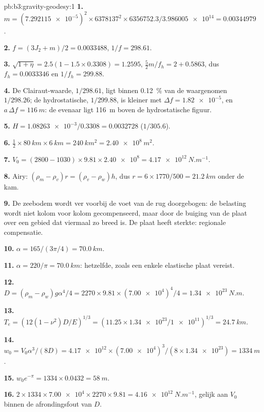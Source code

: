 \begin{solution}{pb:b3:gravity-geodesy:1}
\textbf{1.} $m = (\num{7.292115e-5})^2\times6378137^2\times6356752.3/
\num{3.986005e14} = \num{0.00344979}$.

\textbf{2.} $f = (3J_2 + m)/2 = \num{0.0033488}$, $1/f = 298.61$.

\textbf{3.} $\sqrt{1 + \eta} = 2.5(1 - 1.5\times0.3308) = 1.2595$,
$\tfrac52m/f_h = 2 + 0.5863$, dus $f_h = \num{0.0033346}$ en $1/f_h = 299.88$.

\textbf{4.} De Clairaut-waarde, $1/298.61$, ligt binnen \qty{0.12}{\percent} van
de waargenomen $1/298.26$; de hydrostatische, $1/299.88$, is kleiner met
$\Delta f = \num{1.82e-5}$, en $a\,\Delta f = \qty{116}{m}$: de evenaar ligt
\qty{116}{m} boven de hydrostatische figuur.

\textbf{5.} $H = \num{1.08263e-3}/0.3308 = \num{0.0032728}$ ($1/305.6$).

\textbf{6.} $\tfrac12\times\qty{80}{km}\times\qty{6}{km} = \qty{240}{km^2} =
\qty{2.40e8}{m^2}$.

\textbf{7.} $V_0 = (2800 - 1030)\times9.81\times\num{2.40e8} =
\qty{4.17e12}{N.m^{-1}}$.

\textbf{8.} Airy: $(\rho_m - \rho_v)r = (\rho_v - \rho_w)h$, dus $r =
6\times1770/500 = \qty{21.2}{km}$ onder de kam.

\textbf{9.} De zeebodem wordt ver voorbij de voet van de rug doorgebogen: de
belasting wordt niet kolom voor kolom gecompenseerd, maar door de buiging van de plaat over een
gebied dat viermaal zo breed is. De plaat heeft sterkte: regionale compensatie.

\textbf{10.} $\alpha = 165/(3\pi/4) = \qty{70.0}{km}$.

\textbf{11.} $\alpha = 220/\pi = \qty{70.0}{km}$: hetzelfde, zoals een enkele elastische
plaat vereist.

\textbf{12.} $D = (\rho_m - \rho_w)g\alpha^4/4 = 2270\times9.81\times(\num{7.00e4})^4/4
= \qty{1.34e23}{N.m}$.

\textbf{13.} $T_e = (12(1 - \nu^2)D/E)^{1/3} = (11.25\times\num{1.34e23}/
\num{1e11})^{1/3} = \qty{24.7}{km}$.

\textbf{14.} $w_0 = V_0\alpha^3/(8D) = \num{4.17e12}\times(\num{7.00e4})^3/
(8\times\num{1.34e23}) = \qty{1334}{m}$.

\textbf{15.} $w_0e^{-\pi} = 1334\times0.0432 = \qty{58}{m}$.

\textbf{16.} $2\times1334\times\num{7.00e4}\times2270\times9.81 =
\qty{4.16e12}{N.m^{-1}}$, gelijk aan $V_0$ binnen de afrondingsfout van $D$.


\end{solution}
